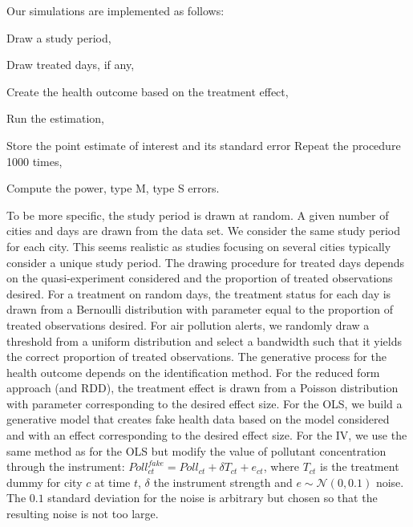 \documentclass[12pt]{article}
\newenvironment{senumerate}{\enumerate\addtolength{\itemsep}{-10pt}}{\endenumerate} %
\begin{document}
       Our simulations are implemented as follows:

        \begin{senumerate}
            \item Draw a study period,
            \item Draw treated days, if any,
            \item Create the health outcome based on the treatment effect,
            \item Run the estimation,
            \item Store the point estimate of interest and its standard error Repeat the procedure 1000 times,
            \item Compute the power, type M, type S errors.
        \end{senumerate}
        
        To be more specific, the study period is drawn at random. A given number of cities and days are drawn from the data set. We consider the same study period for each city. This seems realistic as studies focusing on several cities typically consider a unique study period. The drawing procedure for treated days depends on the quasi-experiment considered and the proportion of treated observations desired. For a treatment on random days, the treatment status for each day is drawn from a Bernoulli distribution with parameter equal to the proportion of treated observations desired. For air pollution alerts, we randomly draw a threshold from a uniform distribution and select a bandwidth such that it yields the correct proportion of treated observations. The generative process for the health outcome depends on the identification method. For the reduced form approach (and RDD), the treatment effect is drawn from a Poisson distribution with parameter corresponding to the desired effect size. For the OLS, we build a generative model that creates fake health data based on the model considered and with an effect corresponding to the desired effect size. For the IV, we use the same method as for the OLS but modify the value of pollutant concentration through the instrument: $Poll_{ct}^{fake} = Poll_{ct} + \delta T_{ct} + e_{ct}$, where $T_{ct}$ is the treatment dummy for city $c$ at time $t$, $\delta$ the instrument strength and $e \sim \mathcal{N}(0, 0.1)$ noise. The $0.1$ standard deviation for the noise is arbitrary but chosen so that the resulting noise is not too large. 
            
        
\end{document}
